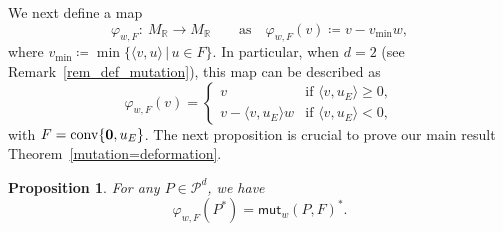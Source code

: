 \documentclass[pdftex]{sigma}%
\numberwithin{equation}{section}
\numberwithin{figure}{section}
\numberwithin{table}{section}
\newtheorem{Proposition}[Theorem]{Proposition}
 { \theoremstyle{definition}
\newtheorem{Definition}[Theorem]{Definition}
\newtheorem{Note}[Theorem]{Note}
\newtheorem{Example}[Theorem]{Example}
\newtheorem{Remark}[Theorem]{Remark}
\newtheorem{observation}[Theorem]{Observation}
\newtheorem{operation}[Theorem]{Operation}
\newtheorem{setting}[Theorem]{Setting}}
\newcommand{\RR}{\mathbb{R}}
\newcommand{\calP}{\mathcal{P}}
\newcommand{\mut}{\mathsf{mut}}
\begin{document}
We next define a map
\[
\varphi_{w,F}\colon \ M_\RR\rightarrow M_\RR \qquad \text{as} \quad \varphi_{w,F}(v)\coloneqq v-v_{\min}w,
\]
where \mbox{$v_{\min}\coloneqq {\min}\{\langle v, u\rangle\,|\, u\in F\}$}.
In particular, when $d=2$ (see Remark~\ref{rem_def_mutation}), this map can be described as
\begin{equation}\label{mutation_M}
\varphi_{w,F}(v)=
\begin{cases}
v & \text{if $\langle v,u_E\rangle\ge0$}, \\
v-\langle v,u_E\rangle w&\text{if $\langle v,u_E\rangle<0$},
\end{cases}
\end{equation}
with $F=\operatorname{conv}\{{\bf 0},u_E\}$.
The next proposition is crucial to prove our main result Theorem~\ref{mutation=deformation}.


\begin{Proposition}
\label{prop_mutation_dual_polytope}
For any $P \in \calP^d$, we have
\begin{displaymath}\varphi_{w,F}(P^*)=\mut_w(P,F)^*.
\end{displaymath}
\end{Proposition}
\end{document}
